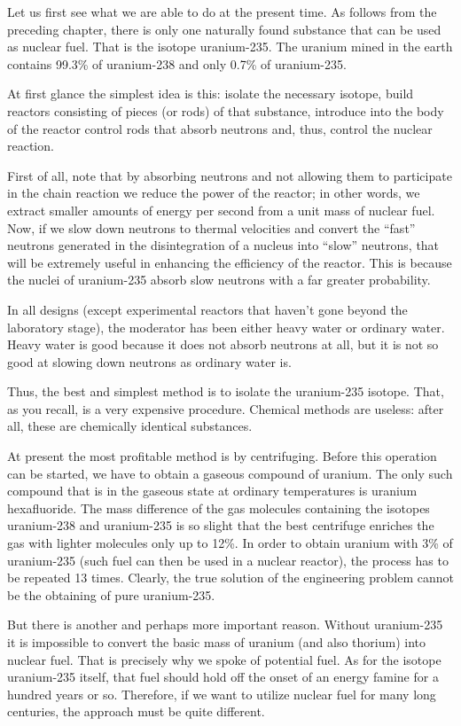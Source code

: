 Let us first see what we are able to do at the present time. As follows from the preceding chapter, there is only one naturally found substance that can be used as nuclear fuel. That is the isotope uranium-235. The ura­nium mined in the earth contains 99.3\% of uranium-238 and only 0.7\% of uranium-235.

At first glance the simplest idea is this: isolate the necessary isotope, build reactors consisting of pieces (or rods) of that substance, introduce into the body of the reactor control rods that absorb neutrons and, thus, con­trol the nuclear reaction.

First of all, note that by absorbing neutrons and not allowing them to participate in the chain reaction we reduce the power of the reactor; in other words, we extract smaller amounts of energy per second from a unit mass of nuclear fuel. Now, if we slow down neutrons to thermal velocities and convert the ``fast'' neutrons generated in the disintegration of a nucleus into ``slow'' neutrons, that will be extremely useful in enhancing the efficiency of the reactor. This is because the nuclei of uranium-235 absorb slow neutrons with a far greater probability.

In all designs (except experimental reactors that haven't gone beyond the laboratory stage), the moderator has been either heavy water or ordinary water. Heavy water is good because it does not absorb neutrons at all, but it is not so good at slowing down neutrons as ordinary water is.

Thus, the best and simplest method is to isolate the uranium-235 isotope. That, as you recall, is a very expen­sive procedure. Chemical methods are useless: after all, these are chemically identical substances.

At present the most profitable method is by centrifug­ing. Before this operation can be started, we have to obtain a gaseous compound of uranium. The only such compound that is in the gaseous state at ordinary temper­atures is uranium hexafluoride. The mass difference of the gas molecules containing the isotopes uranium-238 and uranium-235 is so slight that the best centrifuge enriches the gas with lighter molecules only up to 12\%. In order to obtain uranium with 3\% of uranium-235 (such fuel can then be used in a nuclear reactor), the process has to be repeated 13 times. Clearly, the true solution of the engineering problem cannot be the obtaining of pure uranium-235.

But there is another and perhaps more important rea­son. Without uranium-235 it is impossible to convert the basic mass of uranium (and also thorium) into nuclear fuel. That is precisely why we spoke of potential fuel. As for the isotope uranium-235 itself, that fuel should hold off the onset of an energy famine for a hundred years or so. Therefore, if we want to utilize nuclear fuel for many long centuries, the approach must be quite differ­ent.

